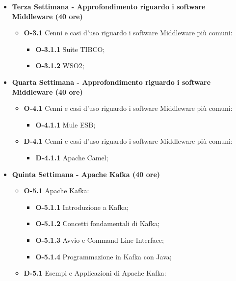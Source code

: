 {\begin{itemize}
        \item \textbf{Terza Settimana - Approfondimento riguardo i software Middleware (40 ore)}
        \begin{itemize}
            \item \textbf{O-3.1} Cenni e casi d'uso riguardo i software Middleware più comuni:
              \begin{itemize}
                \item \textbf{O-3.1.1} Suite TIBCO;
                \item \textbf{O-3.1.2} WSO2;
              \end{itemize}
        \end{itemize}


        \item \textbf{Quarta Settimana - Approfondimento riguardo i software Middleware (40 ore)}
        \begin{itemize}
            \item \textbf{O-4.1} Cenni e casi d'uso riguardo i software Middleware più comuni:
              \begin{itemize}
                \item \textbf{O-4.1.1} Mule ESB;
              \end{itemize}
            \item \textbf{D-4.1} Cenni e casi d'uso riguardo i software Middleware più comuni:
              \begin{itemize}
                \item \textbf{D-4.1.1} Apache Camel;
              \end{itemize}
        \end{itemize}

        \newpage

        \item \textbf{Quinta Settimana - Apache Kafka (40 ore)}
        \begin{itemize}
          \item \textbf{O-5.1} Apache Kafka:
            \begin{itemize}
              \item \textbf{O-5.1.1} Introduzione a Kafka;
              \item \textbf{O-5.1.2} Concetti fondamentali di Kafka;
              \item \textbf{O-5.1.3} Avvio e Command Line Interface;
              \item \textbf{O-5.1.4} Programmazione in Kafka con Java;
            \end{itemize}
            \item \textbf{D-5.1} Esempi e Applicazioni di Apache Kafka:
        \end{itemize}



\end{itemize}}
